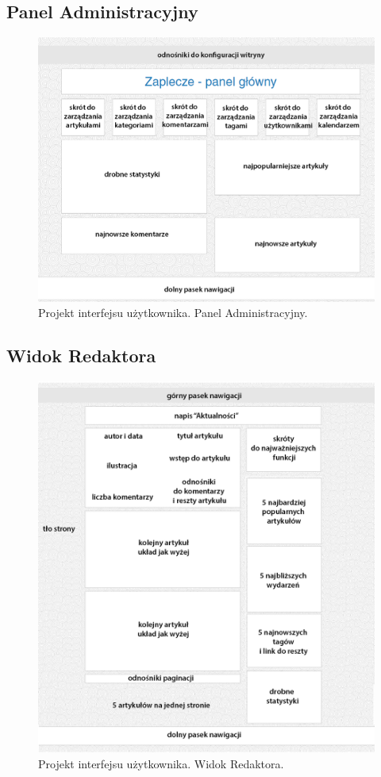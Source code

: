 \documentclass[openright]{xmgr}
\begin{document}
\subsection{Panel Administracyjny}
\begin{figure}[!tbh]
\centering
\includegraphics[width=.9\linewidth]{fig/gui_admin}
\caption{Projekt interfejsu użytkownika. Panel Administracyjny.\label{RYS.3}}
\end{figure}

\newpage

\subsection{Widok Redaktora}
\begin{figure}[!tbh]
\centering
\includegraphics[width=.9\linewidth]{fig/gui_editor}
\caption{Projekt interfejsu użytkownika. Widok Redaktora.\label{RYS.4}}
\end{figure}
\end{document}
